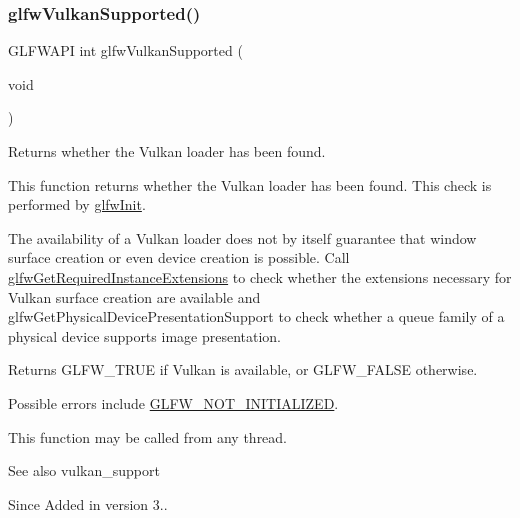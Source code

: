 \subsubsection{\texorpdfstring{glfw\+Vulkan\+Supported()}{glfwVulkanSupported()}}
{\footnotesize\ttfamily G\+L\+F\+W\+A\+PI int glfw\+Vulkan\+Supported (\begin{DoxyParamCaption}\item[{void}]{ }\end{DoxyParamCaption})}



Returns whether the Vulkan loader has been found. 

This function returns whether the Vulkan loader has been found. This check is performed by \hyperlink{group__init_gab41771f0215a2e0afb4cf1cf98082d40}{glfw\+Init}.

The availability of a Vulkan loader does not by itself guarantee that window surface creation or even device creation is possible. Call \hyperlink{group__vulkan_ga70adaf0cfc99adc484c49ea99e17c2cf}{glfw\+Get\+Required\+Instance\+Extensions} to check whether the extensions necessary for Vulkan surface creation are available and glfw\+Get\+Physical\+Device\+Presentation\+Support to check whether a queue family of a physical device supports image presentation.

\begin{DoxyReturn}{Returns}
{\ttfamily G\+L\+F\+W\+\_\+\+T\+R\+UE} if Vulkan is available, or {\ttfamily G\+L\+F\+W\+\_\+\+F\+A\+L\+SE} otherwise.
\end{DoxyReturn}
Possible errors include \hyperlink{group__errors_ga2374ee02c177f12e1fa76ff3ed15e14a}{G\+L\+F\+W\+\_\+\+N\+O\+T\+\_\+\+I\+N\+I\+T\+I\+A\+L\+I\+Z\+ED}.

This function may be called from any thread.

\begin{DoxySeeAlso}{See also}
vulkan\+\_\+support
\end{DoxySeeAlso}
\begin{DoxySince}{Since}
Added in version 3.. 
\end{DoxySince}
